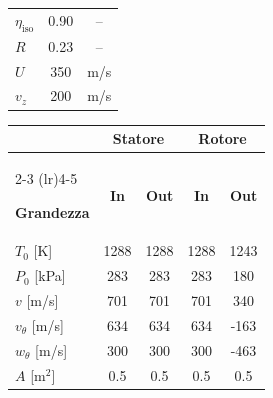 {\begin{table}[H]
\begin{minipage}[t]{0.39\textwidth}
\begin{tabular}{lcc}
        $\eta_{\mathrm{iso}}$
        & 0.90 & -- \\

        $R$
        & 0.23 & -- \\

        $U$
        & 350 & m/s \\

        $v_z$
        & 200 & m/s \\

        \bottomrule
    \end{tabular}

\end{minipage}
\hfill
\begin{minipage}[t]{0.57\textwidth}
    \centering

    \begin{tabular}{lcccc}
        \toprule
        &
        \multicolumn{2}{c}{\textbf{Statore}} &
        \multicolumn{2}{c}{\textbf{Rotore}} \\
        \cmidrule(lr){2-3}
        \cmidrule(lr){4-5}

        \textbf{Grandezza} &
        \textbf{In} &
        \textbf{Out} &
        \textbf{In} &
        \textbf{Out} \\
        \midrule

        $T_0$ [K]
        & 1288 & 1288 & 1288 & 1243 \\

        $P_0$ [kPa]
        & 283 & 283 & 283 & 180 \\

        $v$ [m/s]
        & 701 & 701 & 701 & 340 \\

        $v_{\theta}$ [m/s]
        & 634 & 634 & 634 & -163 \\

        $w_{\theta}$ [m/s]
        & 300 & 300 & 300 & -463 \\

        $A$ [m$^2$]
        & 0.5 & 0.5 & 0.5 & 0.5 \\

        \bottomrule
    \end{tabular}

\end{minipage}

\end{table}


} %